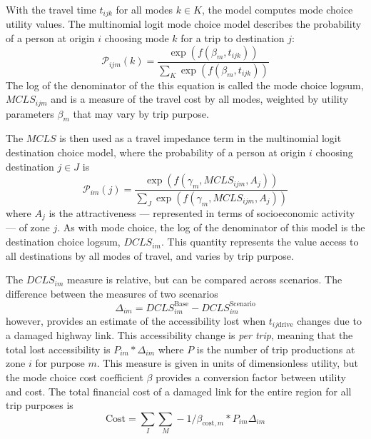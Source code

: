 \documentclass[3p, authoryear]{elsarticle} %
\begin{document}
With the travel time \(t_{ijk}\) for all modes \(k \in K\), the model computes
mode choice utility values. The multinomial logit mode choice model describes
the probability of a person at origin \(i\) choosing mode \(k\) for a trip to
destination \(j\):
\begin{equation}
\mathcal{P}_{ijm}(k) = \frac{\exp(f(\beta_{m}, t_{ijk}))}{\sum_{K}\exp(f(\beta_{m}, t_{ijk}))}
  \label{eq:mcp}
\end{equation}
The log of the denominator of the this equation is called the
mode choice logsum, \(MCLS_{ijm}\) and is a measure of the travel cost by all
modes, weighted by utility parameters \(\beta_m\) that may vary by trip purpose.

The \(MCLS\) is then used as a travel impedance term in the multinomial logit
destination choice model, where the probability of a person at origin \(i\)
choosing destination \(j \in J\) is
\begin{equation}
\mathcal{P}_{im}(j) = \frac{\exp(f(\gamma_{m}, MCLS_{ijm}, A_j))}{\sum_{J}\exp(f(\gamma_{m}, MCLS_{ijm}, A_j))}
  \label{eq:dcp}
\end{equation}
where \(A_j\) is the attractiveness --- represented in terms of socioeconomic activity
--- of zone \(j\). As with mode choice, the log of the denominator of this model is the destination
choice logsum, \(DCLS_{im}\). This quantity represents the value access to all destinations
by all modes of travel, and varies by trip purpose.

The \(DCLS_{im}\) measure is relative, but can be compared across scenarios. The
difference between the measures of two scenarios
\begin{equation}
\Delta_{im} = DCLS_{im}^{\mathrm{Base}} - DCLS_{im}^{\mathrm{Scenario}}
  \label{eq:deltas}
\end{equation}
however, provides an estimate of the accessibility lost when \(t_{ij\mathrm{drive}}\)
changes due to a damaged highway link. This accessibility change is \emph{per trip},
meaning that the total lost accessibility is \(P_{im} * \Delta_{im}\) where \(P\) is
the number of trip productions at zone \(i\) for purpose \(m\). This measure is
given in units of dimensionless utility, but the mode choice cost coefficient
\(\beta\) provides a conversion factor between utility and cost. The total financial
cost of a damaged link for the entire region for all trip purposes is
\begin{equation}
\mathrm{Cost} = \sum_{I}\sum_{M} -1 / \beta_{\mathrm{cost},m} * P_{im} \Delta_{im}
  \label{eq:totalcost}
\end{equation}
\end{document}
